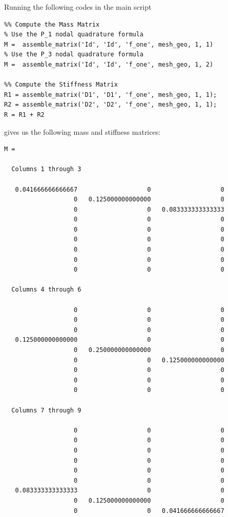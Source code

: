 \documentclass[11pt,a4paper,center,notitlepage]{article}
\numberwithin{equation}{section}
\begin{document}
Running the following codes in the main script
\begin{verbatim}
%% Compute the Mass Matrix 
% Use the P_1 nodal quadrature formula
M =  assemble_matrix('Id', 'Id', 'f_one', mesh_geo, 1, 1)
% Use the P_3 nodal quadrature formula
M =  assemble_matrix('Id', 'Id', 'f_one', mesh_geo, 1, 2)

%% Compute the Stiffness Matrix
R1 = assemble_matrix('D1', 'D1', 'f_one', mesh_geo, 1, 1);
R2 = assemble_matrix('D2', 'D2', 'f_one', mesh_geo, 1, 1);
R = R1 + R2
\end{verbatim}
gives us the following mass and stiffness matrices:
\begin{verbatim}
M =

  Columns 1 through 3

   0.041666666666667                   0                   0
                   0   0.125000000000000                   0
                   0                   0   0.083333333333333
                   0                   0                   0
                   0                   0                   0
                   0                   0                   0
                   0                   0                   0
                   0                   0                   0
                   0                   0                   0

  Columns 4 through 6

                   0                   0                   0
                   0                   0                   0
                   0                   0                   0
   0.125000000000000                   0                   0
                   0   0.250000000000000                   0
                   0                   0   0.125000000000000
                   0                   0                   0
                   0                   0                   0
                   0                   0                   0

  Columns 7 through 9

                   0                   0                   0
                   0                   0                   0
                   0                   0                   0
                   0                   0                   0
                   0                   0                   0
                   0                   0                   0
   0.083333333333333                   0                   0
                   0   0.125000000000000                   0
                   0                   0   0.041666666666667



\end{verbatim}
\end{document}

